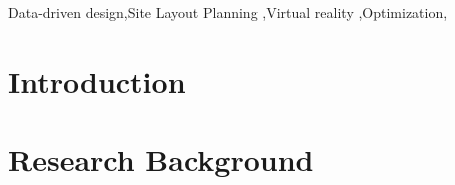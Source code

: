 \documentclass[final,5p,times]{elsarticle}
\begin{document}
\begin{frontmatter}
\begin{highlights}

\end{highlights}

\begin{keyword}
Data-driven design\sep Site Layout Planning \sep Virtual reality \sep Optimization\sep

\end{keyword}

\end{frontmatter}
%
\begin{linenumbers}


\section{Introduction}
\label{sec:1Introduction}


\section{Research Background}
\label{sec:Background}


\end{linenumbers}
    
    
\end{document}
